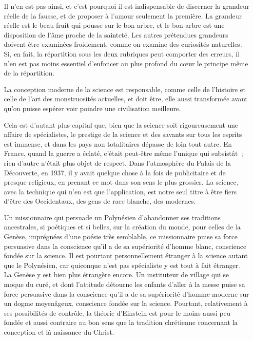 \documentclass[french,twoside]{book} %
\begin{document}
Il n'en est pas ainsi, et c'est pourquoi il est indispensable de discerner la grandeur réelle de la fausse, et de proposer à l'amour seulement la première. La grandeur réelle est le beau fruit qui pousse sur le bon arbre, et le bon arbre est une disposition de l'âme proche de la sainteté. Les autres prétendues grandeurs doivent être examinées froidement, comme on examine des curiosités naturelles. Si, en fait, la répartition sous les deux rubriques peut comporter des erreurs, il n'en est pas moins essentiel d'enfoncer au plus profond du cœur le principe même de la répartition.\par
La conception moderne de la science est responsable, comme celle de l'histoire et celle de l'art des monstruosités actuelles, et doit être, elle aussi transformée avant qu'on puisse espérer voir poindre une civilisation meilleure.\par
Cela est d'autant plus capital que, bien que la science soit rigoureusement une affaire de spécialistes, le prestige de la science et des savants sur tous les esprits est immense, et dans les pays non totalitaires dépasse de loin tout autre. En France, quand la guerre a éclaté, c'était peut-être même l'unique qui subsistât ; rien d'autre n'était plus objet de respect. Dans l'atmosphère du Palais de la Découverte, en 1937, il y avait quelque chose à la fois de publicitaire et de presque religieux, en prenant ce mot dans son sens le plus grossier. La science, avec la technique qui n'en est que l'application, est notre seul titre à être fiers d'être des Occidentaux, des gens de race blanche, des modernes.\par
Un missionnaire qui persuade un Polynésien d'abandonner ses traditions ancestrales, si poétiques et si belles, sur la création du monde, pour celles de la Genèse, imprégnées d'une poésie très semblable, ce missionnaire puise sa force persuasive dans la conscience qu'il a de sa supériorité d'homme blanc, conscience fondée sur la science. Il est pourtant personnellement étranger à la science autant que le Polynésien, car quiconque n'est pas spécialiste y est tout à fait étranger. La Genèse y est bien plus étrangère encore. Un instituteur de village qui se moque du curé, et dont l'attitude détourne les enfants d'aller à la messe puise sa force persuasive dans la conscience qu'il a de sa supériorité d'homme moderne sur un dogme moyenâgeux, conscience fondée sur la science. Pourtant, relativement à ses possibilités de contrôle, la théorie d'Einstein est pour le moins aussi peu fondée et aussi contraire au bon sens que la tradition chrétienne concernant la conception et là naissance du Christ.\par
\end{document}

